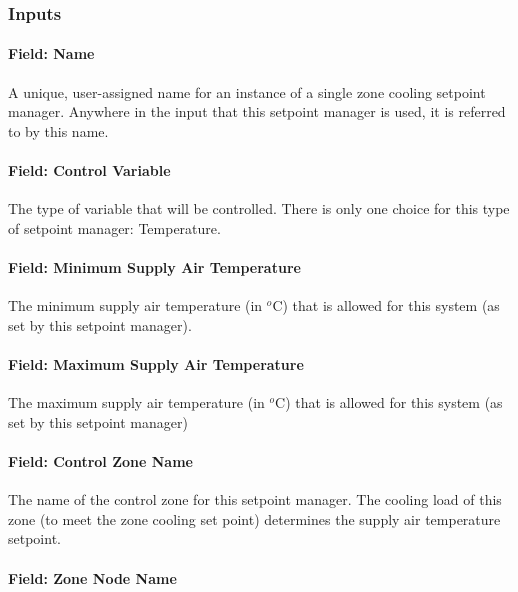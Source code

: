 \subsubsection{Inputs}\label{inputs-5-027}

\paragraph{Field: Name}\label{field-name-5-022}

A unique, user-assigned name for an instance of a single zone cooling setpoint manager. Anywhere in the input that this setpoint manager is used, it is referred to by this name.

\paragraph{Field: Control Variable}\label{field-control-variable-5}

The type of variable that will be controlled. There is only one choice for this type of setpoint manager: Temperature.

\paragraph{Field: Minimum Supply Air Temperature}\label{field-minimum-supply-air-temperature-2}

The minimum supply air temperature (in \(^{o}\)C) that is allowed for this system (as set by this setpoint manager).

\paragraph{Field: Maximum Supply Air Temperature}\label{field-maximum-supply-air-temperature-2}

The maximum supply air temperature (in \(^{o}\)C) that is allowed for this system (as set by this setpoint manager)

\paragraph{Field: Control Zone Name}\label{field-control-zone-name-2}

The name of the control zone for this setpoint manager. The cooling load of this zone (to meet the zone cooling set point) determines the supply air temperature setpoint.

\paragraph{Field: Zone Node Name}\label{field-zone-node-name-2}

